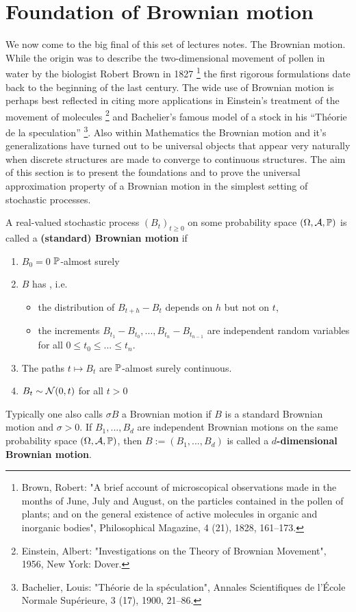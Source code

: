 \section{Foundation of Brownian motion}
\marginpar{\textcolor{red}{Lecture 23}}
We now come to the big final of this set of lectures notes. The Brownian motion. While the origin was to describe the two-dimensional movement of pollen in water by the biologist Robert Brown in 1827 \footnote{Brown, Robert: "{}A brief account of microscopical observations made in the months of June, July and August, on the particles contained in the pollen of plants; and on the general existence of active molecules in organic and inorganic bodies"{}, Philosophical Magazine, 4 (21), 1828, 161–173.} the first rigorous formulations date back to the beginning of the last century. The wide use of Brownian motion is perhaps best reflected in citing more applications in Einstein's treatment of the movement of molecules \footnote{Einstein, Albert: "{}Investigations on the Theory of Brownian Movement"{}, 1956, New York: Dover.} and Bachelier's famous model of a stock in his \enquote{Th\'{e}orie de la speculation} \footnote{Bachelier, Louis: "{}Th\'eorie de la sp\'eculation"{}, Annales Scientifiques de l'École Normale Supérieure, 3 (17), 1900, 21–86.}. Also within Mathematics the Brownian motion and it's generalizations have turned out to be universal objects that appear very naturally when discrete structures are made to converge to continuous structures. The aim of this section is to present the foundations and to prove the universal approximation property of a Brownian motion in the simplest setting of stochastic processes. 
\begin{ldef}
\begin{deff}\label{def_BM}
	A real-valued stochastic process $(B_t)_{t\geq 0}$ on some probability space $(\Omega,\cA,\mathbb{P})$ is called a \textbf{(standard) Brownian motion} if
	\begin{enumerate}[label=(\roman*)]
		\item $B_0 = 0$ $\P$-almost surely
		\item $B$ has \textbf{}, i.e. 
			\begin{itemize}
				\item
				the distribution of $B_{t+h}-B_t$ depends on $h$ but not on $t$,
				\item
				the increments	$B_{t_1} - B_{t_0},...,B_{t_n} - B_{t_{n-1}}$ are independent random variables for all $0 \leq t_0 \leq ...\leq t_n$.
			\end{itemize}
		\item
			The paths $t \mapsto B_t$ are $\P$-almost surely continuous.
		\item
			$B_t \sim \cN(0,t)$ for all $t > 0$
	\end{enumerate}
	Typically one also calls $\sigma B$ a Brownian motion if $B$ is a standard Brownian motion and $\sigma>0$. If $B_1,...,B_d$ are independent Brownian motions on the same probability space $(\Omega, \mathcal A, \P)$, then $B:=(B_1,...,B_d)$ is called a \textbf{$d$-dimensional Brownian motion}.
\end{deff}
\end{ldef}
